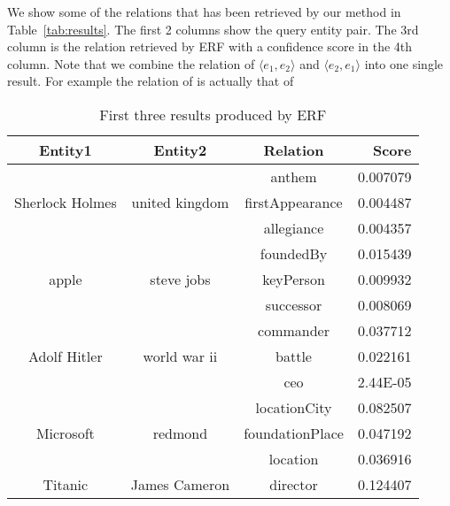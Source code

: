 We show some of the relations that has been retrieved by our method in Table~\ref{tab:results}.
The first 2 columns show the query entity pair.
The 3rd column is the relation retrieved by ERF with a confidence score in the 4th column.
Note that we combine the relation of $\langle e_1,e_2\rangle$ and $\langle e_2,e_1\rangle$ into one single result.
For example the relation  of  is actually that of 
\begin{table}[ht!]
  \centering
  \caption{First three results produced by ERF}
    \begin{tabular}{cccr}
    \toprule
    Entity1 & Entity2 & Relation & Score \\
    \midrule
    \multicolumn{1}{c}{\multirow{3}{*}{\parbox{1cm}{ Sherlock Holmes}}} & \multicolumn{1}{c}{\multirow{3}[0]{*}{united kingdom}} & anthem & 0.007079 \\
    \multicolumn{1}{c}{} & \multicolumn{1}{c}{} & firstAppearance & 0.004487 \\
    \multicolumn{1}{c}{} & \multicolumn{1}{c}{} & allegiance & 0.004357 \\
    \hline
    \multicolumn{1}{c}{\multirow{3}{*}{\parbox{1cm}{\centering apple}}} & \multicolumn{1}{c}{\multirow{3}[0]{*}{steve jobs}} & foundedBy & 0.015439 \\
    \multicolumn{1}{c}{} & \multicolumn{1}{c}{} & keyPerson & 0.009932 \\
    \multicolumn{1}{c}{} & \multicolumn{1}{c}{} & successor & 0.008069 \\
    \hline
    \multicolumn{1}{c}{\multirow{3}{*}{\parbox{1cm}{\centering Adolf Hitler}}} & \multicolumn{1}{c}{\multirow{3}[0]{*}{world war ii}} & commander & 0.037712 \\
    \multicolumn{1}{c}{} & \multicolumn{1}{c}{} & battle & 0.022161 \\
    \multicolumn{1}{c}{} & \multicolumn{1}{c}{} & ceo   & 2.44E-05 \\
    \hline
    \multicolumn{1}{c}{\multirow{3}{*}{\parbox{1cm}{\centering Microsoft}}} & \multicolumn{1}{c}{\multirow{3}[0]{*}{redmond}} & locationCity & 0.082507 \\
    \multicolumn{1}{c}{} & \multicolumn{1}{c}{} & foundationPlace & 0.047192 \\
    \multicolumn{1}{c}{} & \multicolumn{1}{c}{} & location & 0.036916 \\
    \hline
    \multicolumn{1}{c}{\multirow{3}{*}{Titanic}} & \multicolumn{1}{c}{\multirow{3}[0]{*}{James Cameron}} & director & 0.124407 \\

\end{tabular}
\end{table}
